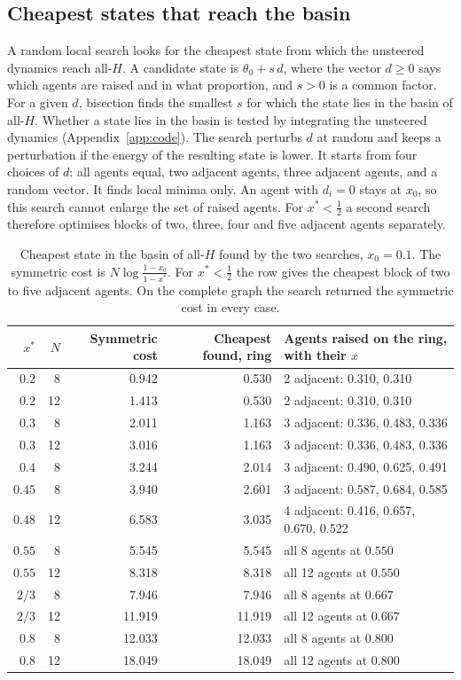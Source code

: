\documentclass[11pt,a4paper]{article}
\theoremstyle{definition}
\theoremstyle{plain}
\newcommand{\xs}{x^{*}}
\begin{document}
\subsection{Cheapest states that reach the basin}\label{sec:search}

A random local search looks for the cheapest state from which the unsteered dynamics reach all-$H$. A candidate state is $\theta_0+s\,d$, where the vector $d\ge0$ says which agents are raised and in what proportion, and $s>0$ is a common factor. For a given $d$, bisection finds the smallest $s$ for which the state lies in the basin of all-$H$. Whether a state lies in the basin is tested by integrating the unsteered dynamics (Appendix~\ref{app:code}). The search perturbs $d$ at random and keeps a perturbation if the energy of the resulting state is lower. It starts from four choices of $d$: all agents equal, two adjacent agents, three adjacent agents, and a random vector. It finds local minima only. An agent with $d_i=0$ stays at $x_0$, so this search cannot enlarge the set of raised agents. For $\xs<\tfrac12$ a second search therefore optimises blocks of two, three, four and five adjacent agents separately.

\begin{table}[H]
\centering\small
\begin{tabular}{rrrrl}
\toprule
$\xs$ & $N$ & Symmetric cost & Cheapest found, ring & Agents raised on the ring, with their $x$\\
\midrule
$0.2$ & 8 & 0.942 & 0.530 & 2 adjacent: 0.310, 0.310\\
$0.2$ & 12 & 1.413 & 0.530 & 2 adjacent: 0.310, 0.310\\
$0.3$ & 8 & 2.011 & 1.163 & 3 adjacent: 0.336, 0.483, 0.336\\
$0.3$ & 12 & 3.016 & 1.163 & 3 adjacent: 0.336, 0.483, 0.336\\
$0.4$ & 8 & 3.244 & 2.014 & 3 adjacent: 0.490, 0.625, 0.491\\
$0.45$ & 8 & 3.940 & 2.601 & 3 adjacent: 0.587, 0.684, 0.585\\
$0.48$ & 12 & 6.583 & 3.035 & 4 adjacent: 0.416, 0.657, 0.670, 0.522\\
$0.55$ & 8 & 5.545 & 5.545 & all 8 agents at $0.550$\\
$0.55$ & 12 & 8.318 & 8.318 & all 12 agents at $0.550$\\
$2/3$ & 8 & 7.946 & 7.946 & all 8 agents at $0.667$\\
$2/3$ & 12 & 11.919 & 11.919 & all 12 agents at $0.667$\\
$0.8$ & 8 & 12.033 & 12.033 & all 8 agents at $0.800$\\
$0.8$ & 12 & 18.049 & 18.049 & all 12 agents at $0.800$\\
\bottomrule
\end{tabular}
\caption{Cheapest state in the basin of all-$H$ found by the two searches, $x_0=0.1$. The symmetric cost is $N\log\frac{1-x_0}{1-\xs}$. For $\xs<\tfrac12$ the row gives the cheapest block of two to five adjacent agents. On the complete graph the search returned the symmetric cost in every case.}\label{tab:search}
\end{table}
\end{document}
